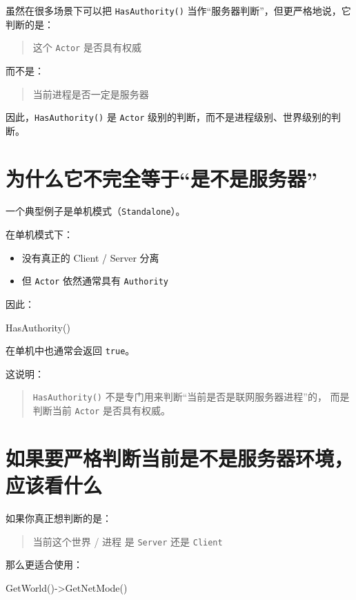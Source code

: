虽然在很多场景下可以把 \texttt{HasAuthority()} 当作“服务器判断”，但更严格地说，它判断的是：

\begin{quote}
	这个 \texttt{Actor} 是否具有权威
\end{quote}

而不是：

\begin{quote}
	当前进程是否一定是服务器
\end{quote}

因此，\texttt{HasAuthority()} 是 \texttt{Actor} 级别的判断，而不是进程级别、世界级别的判断。

\section{为什么它不完全等于“是不是服务器”}

一个典型例子是单机模式（\texttt{Standalone}）。

在单机模式下：

\begin{itemize}
	\item 没有真正的 Client / Server 分离
	\item 但 \texttt{Actor} 依然通常具有 \texttt{Authority}
\end{itemize}

因此：

\begin{code}
	HasAuthority()
\end{code}

在单机中也通常会返回 \texttt{true}。

这说明：

\begin{quote}
	\texttt{HasAuthority()} 不是专门用来判断“当前是否是联网服务器进程”的，
	而是判断当前 \texttt{Actor} 是否具有权威。
\end{quote}

\section{如果要严格判断当前是不是服务器环境，应该看什么}

如果你真正想判断的是：

\begin{quote}
	当前这个世界 / 进程 是 \texttt{Server} 还是 \texttt{Client}
\end{quote}

那么更适合使用：

\begin{code}
	GetWorld()->GetNetMode()
\end{code}

